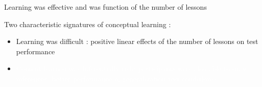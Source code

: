 \documentclass[11pt]{beamer}
\begin{document}
                    \begin{frame}


                      
                      
                     Learning was effective and was function of the number of lessons 
                     



                     Two characteristic signatures of conceptual learning :

                     \begin{itemize}

                       \item{Learning was \textcolor{bittersweet}{difficult} :  positive linear effects of the number of lessons on test performance}


                         \item{\textcolor{white}{ Content learned was inferentially rich: participants  were also able to draw inferences (better performance in generalization test conditions)}}

                      \end{itemize}


                    \end{frame}
\end{document}
